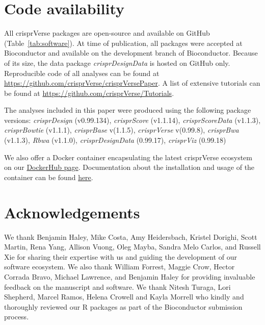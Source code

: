 \documentclass[pdftex,english,10pt]{article}
\begin{document}
{%
\section*{Code availability}

All crisprVerse packages are open-source and available on GitHub (Table~\ref{tab:software}).
At time of publication, all packages were accepted at Bioconductor and available on the development branch of Bioconductor.
Because of its size, the data package \textit{crisprDesignData} is hosted on GitHub only. 
Reproducible code of all analyses can be found at \url{https://github.com/crisprVerse/crisprVersePaper}.
A list of extensive tutorials can be found at \url{https://github.com/crisprVerse/Tutorials}.

The analyses included in this paper were produced using the following package versions: 
\textit{crisprDesign} (v0.99.134),
\textit{crisprScore} (v1.1.14), 
\textit{crisprScoreData} (v1.1.3), 
\textit{crisprBowtie} (v1.1.1),
\textit{crisprBase} v(1.1.5),
\textit{crisprVerse} v(0.99.8),
\textit{crisprBwa} (v1.1.3), 
\textit{Rbwa} (v1.1.0),
\textit{crisprDesignData} (0.99.17),
\textit{crisprViz} (0.99.18)

We also offer a Docker container encapsulating the latest crisprVerse ecosystem on our \href{https://hub.docker.com/repository/docker/fortin946/crisprverse}{DockerHub page}.
Documentation about the installation and usage of the container can be found \href{https://github.com/crisprVerse/Docker}{here}.











\section*{Acknowledgements}

We thank Benjamin Haley, Mike Costa, Amy Heidersbach, Kristel Dorighi, Scott Martin, Rena Yang, Allison Vuong, Oleg Mayba, Sandra Melo Carlos, and Russell Xie for sharing their expertise with us and guiding the development of our software ecosystem. We also thank William Forrest, Maggie Crow, Hector Corrada Bravo, Michael Lawrence, and Benjamin Haley for providing invaluable feedback on the manuscript and software. We thank Nitesh Turaga, Lori Shepherd, Marcel Ramos, Helena Crowell and Kayla Morrell who kindly and thoroughly reviewed our R packages as part of the Bioconductor submission process.


}
\end{document}

